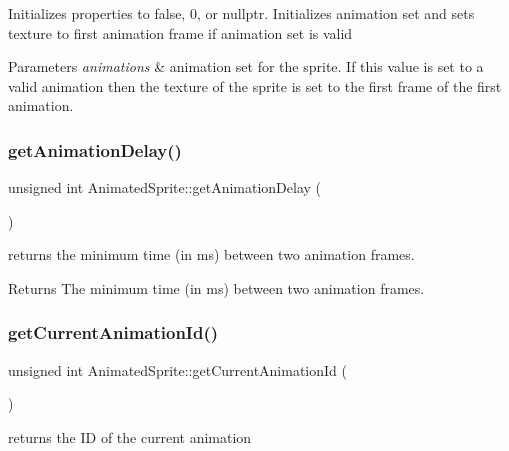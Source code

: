 Initializes properties to false, 0, or nullptr. Initializes animation set and sets texture to first animation frame if animation set is valid 


\begin{DoxyParams}{Parameters}
{\em animations} & animation set for the sprite. If this value is set to a valid animation then the texture of the sprite is set to the first frame of the first animation.\\
\hline
\end{DoxyParams}
\mbox{\label{class_animated_sprite_a23593d75ebc15e0e9969480239ae7830}} 
\subsubsection{\texorpdfstring{get\+Animation\+Delay()}{getAnimationDelay()}}
{\footnotesize\ttfamily unsigned int Animated\+Sprite\+::get\+Animation\+Delay (\begin{DoxyParamCaption}{ }\end{DoxyParamCaption})}



returns the minimum time (in ms) between two animation frames. 

\begin{DoxyReturn}{Returns}
The minimum time (in ms) between two animation frames.
\end{DoxyReturn}
\mbox{\label{class_animated_sprite_abd64b160fdfae1d1eec67e017af5f375}} 
\subsubsection{\texorpdfstring{get\+Current\+Animation\+Id()}{getCurrentAnimationId()}}
{\footnotesize\ttfamily unsigned int Animated\+Sprite\+::get\+Current\+Animation\+Id (\begin{DoxyParamCaption}{ }\end{DoxyParamCaption})}



returns the ID of the current animation 

